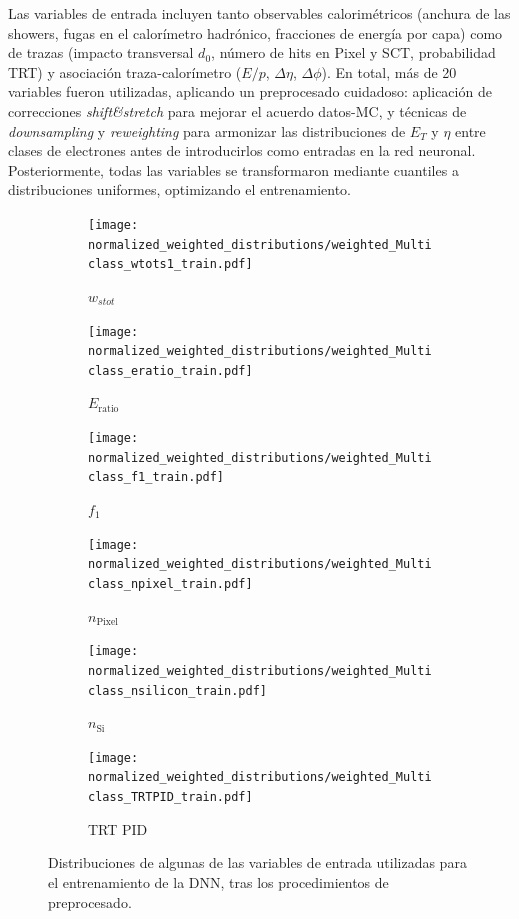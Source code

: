 Las variables de entrada incluyen tanto observables calorimétricos (anchura de las showers, fugas en el calorímetro hadrónico, fracciones de energía por capa) como de trazas (impacto transversal $d_0$, número de hits en Pixel y SCT, probabilidad TRT) y asociación traza-calorímetro ($E/p$, $\Delta\eta$, $\Delta\phi$). En total, más de 20 variables fueron utilizadas, aplicando un preprocesado cuidadoso: aplicación de correcciones \textit{shift\&stretch} para mejorar el acuerdo datos-MC, y técnicas de \textit{downsampling} y \textit{reweighting} para armonizar las distribuciones de $E_T$ y $\eta$ entre clases de electrones antes de introducirlos como entradas en la red neuronal.
Posteriormente, todas las variables se transformaron mediante cuantiles a distribuciones uniformes, optimizando el entrenamiento.  
\begin{figure}[htbp]
  \centering
  \begin{subfigure}[b]{0.49\textwidth}
    \centering
    \texttt{[image: normalized\_weighted\_distributions/weighted\_Multiclass\_wtots1\_train.pdf]}
    \caption{$w_{stot}$}
    \label{res:input7}
  \end{subfigure}\hfill
  \begin{subfigure}[b]{0.49\textwidth}
    \centering
    \texttt{[image: normalized\_weighted\_distributions/weighted\_Multiclass\_eratio\_train.pdf]}
    \caption{$E_{\text{ratio}}$}
    \label{res:input8}
  \end{subfigure}
  \vspace{0.45cm}
  \begin{subfigure}[b]{0.49\textwidth}
    \centering
    \texttt{[image: normalized\_weighted\_distributions/weighted\_Multiclass\_f1\_train.pdf]}
    \caption{$f_1$}
    \label{res:input9}
  \end{subfigure}\hfill
  \begin{subfigure}[b]{0.49\textwidth}
    \centering
    \texttt{[image: normalized\_weighted\_distributions/weighted\_Multiclass\_npixel\_train.pdf]}
    \caption{$n_{\text{Pixel}}$}
    \label{res:input11}
  \end{subfigure}
  \vspace{0.45cm}
  \begin{subfigure}[b]{0.49\textwidth}
    \centering
    \texttt{[image: normalized\_weighted\_distributions/weighted\_Multiclass\_nsilicon\_train.pdf]}
    \caption{$n_{\text{Si}}$}
    \label{res:input12}
  \end{subfigure}\hfill
  \begin{subfigure}[b]{0.49\textwidth}
    \centering
    \texttt{[image: normalized\_weighted\_distributions/weighted\_Multiclass\_TRTPID\_train.pdf]}
    \caption{TRT PID}
    \label{res:input18}
  \end{subfigure}
  \caption{Distribuciones de algunas de las variables de entrada utilizadas para el entrenamiento de la DNN, tras los procedimientos de preprocesado.}
  \label{res:dnn_inputs_distributions_B}
\end{figure}

